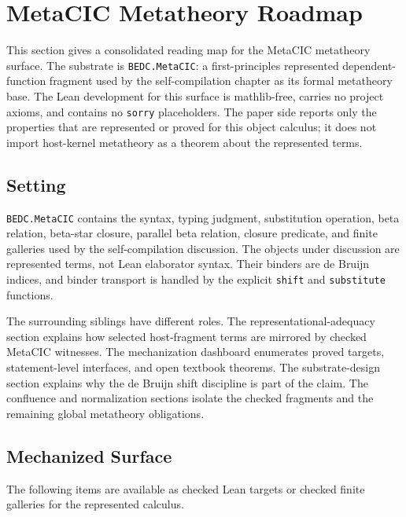 \section{MetaCIC Metatheory Roadmap}
\label{sec:self-comp-metatheory-roadmap}

This section gives a consolidated reading map for the MetaCIC metatheory
surface. The substrate is \texttt{BEDC.MetaCIC}: a first-principles
represented dependent-function fragment used by the self-compilation chapter
as its formal metatheory base. The Lean development for this surface is
mathlib-free, carries no project axioms, and contains no \texttt{sorry}
placeholders. The paper side reports only the properties that are represented
or proved for this object calculus; it does not import host-kernel metatheory
as a theorem about the represented terms.

\subsection{Setting}
\label{subsec:metatheory-roadmap-setting}

\texttt{BEDC.MetaCIC} contains the syntax, typing judgment, substitution
operation, beta relation, beta-star closure, parallel beta relation, closure
predicate, and finite galleries used by the self-compilation discussion. The
objects under discussion are represented terms, not Lean elaborator syntax.
Their binders are de Bruijn indices, and binder transport is handled by the
explicit \texttt{shift} and \texttt{substitute} functions.

The surrounding siblings have different roles. The representational-adequacy
section explains how selected host-fragment terms are mirrored by checked
MetaCIC witnesses. The mechanization dashboard enumerates proved targets,
statement-level interfaces, and open textbook theorems. The substrate-design
section explains why the de Bruijn shift discipline is part of the claim. The
confluence and normalization sections isolate the checked fragments and the
remaining global metatheory obligations.

\subsection{Mechanized Surface}
\label{subsec:metatheory-roadmap-mechanized-surface}

The following items are available as checked Lean targets or checked finite
galleries for the represented calculus.

